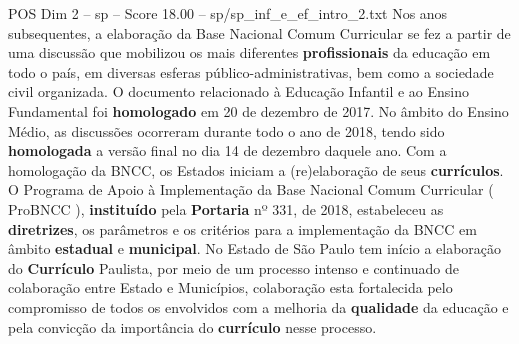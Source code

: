 \begin{textsample}{POS Dim 2 – sp – Score 18.00 – sp/sp\_inf\_e\_ef\_intro\_2.txt}
Nos anos subsequentes, a elaboração da Base Nacional Comum Curricular se fez a partir de uma discussão que mobilizou os mais diferentes \textbf{profissionais} da educação em todo o país, em diversas esferas público-administrativas, bem como a sociedade civil organizada.
O documento relacionado à Educação Infantil e ao Ensino Fundamental foi \textbf{homologado} em 20 de dezembro de 2017.
No âmbito do Ensino Médio, as discussões ocorreram durante todo o ano de 2018, tendo sido \textbf{homologada} a versão final no dia 14 de dezembro daquele ano.
Com a homologação da BNCC, os Estados iniciam a (re)elaboração de seus \textbf{currículos}.
O Programa de Apoio à Implementação da Base Nacional Comum Curricular ( ProBNCC ), \textbf{instituído} pela \textbf{Portaria} nº 331, de 2018, estabeleceu as \textbf{diretrizes}, os parâmetros e os critérios para a implementação da BNCC em âmbito \textbf{estadual} e \textbf{municipal}.
No Estado de São Paulo tem início a elaboração do \textbf{Currículo} Paulista, por meio de um processo intenso e continuado de colaboração entre Estado e Municípios, colaboração esta fortalecida pelo compromisso de todos os envolvidos com a melhoria da \textbf{qualidade} da educação e pela convicção da importância do \textbf{currículo} nesse processo.

\end{textsample}
